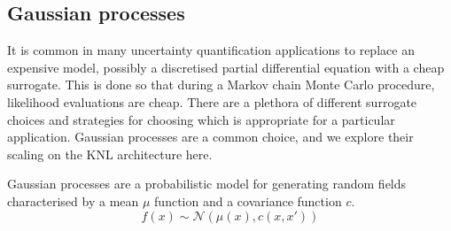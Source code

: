 \subsection{Gaussian processes}
\label{sec:chol}

It is common in many uncertainty quantification applications to replace an
expensive model, possibly a discretised partial differential equation with a
cheap surrogate.  This is done so that during a Markov chain Monte Carlo
procedure, likelihood evaluations are cheap.  There are a plethora of different
surrogate choices and strategies for choosing which is appropriate for a
particular application.  Gaussian processes are a common choice, and we explore
their scaling on the KNL architecture here.

Gaussian processes are a probabilistic model for generating random fields
characterised by a mean $\mu$ function and a covariance function $c$.
\begin{equation}
  f(x) \sim \mathcal{N}(\mu(x), c(x, x'))
\end{equation}


